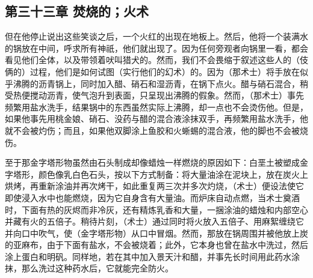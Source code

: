 \par


\subsection{第三十三章 焚烧的；火术}

但在他停止说出这些笑谈之后，一个火红的出现在地板上。然后，他将一个装满水的锅放在中间，呼求所有神祇，他们就出现了。因为任何旁观者向锅里一看，都会看见他们全体，以及带领着吠叫猎犬的。然而，我们不会畏缩于叙述这些人的（伎俩的）过程，他们是如何试图（实行他们的幻术）的。因为（那术士）将手放在似乎沸腾的沥青锅上，同时加入醋、硝石和湿沥青，在锅下点火。醋与硝石混合，稍受热便搅动沥青，使气泡升到表面，只呈现出沸腾的假象。然而，（那术士）事先频繁用盐水洗手，结果锅中的东西虽然实际上沸腾，却一点也不会烫伤他。但是，如果他事先用桃金娘、硝石、没药与醋的混合液涂抹双手，再频繁用盐水洗手，他就不会被灼伤；而且，如果他双脚涂上鱼胶和火蜥蜴的混合液，他的脚也不会被烧伤。\par

至于那金字塔形物虽然由石头制成却像蜡烛一样燃烧的原因如下：白垩土被塑成金字塔形，颜色像乳白色石头，按以下方式制备：将大量油涂在泥块上，放在炭火上烘烤，再重新涂油并再次烤干，如此重复两三次并多次灼烧，（术士）便设法使它即使浸入水中也能燃烧，因为它自身含有大量油。而炉床自动点燃，当术士奠酒时，下面有热的灰烬而非冷灰，还有精炼乳香和大量，一捆涂油的蜡烛和内部空心并藏有火的五倍子。稍待片刻，（术士）通过同时将火放入五倍子、用麻絮缠绕它并向口中吹气，使（金字塔形物）从口中冒烟。然而，那放在锅周围并被他放上炭的亚麻布，由于下面有盐水，不会被烧着；此外，它本身也曾在盐水中洗过，然后涂上蛋白和明矾。同样地，若在其中加入景天汁和醋，并事先长时间用此药水涂抹，那么洗过这种药水后，它就能完全防火。\par

